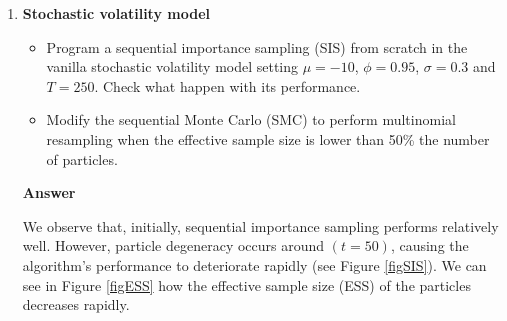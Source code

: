 \begin{enumerate}[leftmargin=*]
\item \textbf{Stochastic volatility model}
\begin{itemize}
	\item Program a sequential importance sampling (SIS) from scratch in the vanilla stochastic volatility model setting $\mu=-10$, $\phi = 0.95$, $\sigma=0.3$ and $T=250$. Check what happen with its performance.
	\item Modify the sequential Monte Carlo (SMC) to perform multinomial resampling when the effective sample size is lower than 50\% the number of particles.  
\end{itemize}

\textbf{Answer}

We observe that, initially, sequential importance sampling performs relatively well. However, particle degeneracy occurs around $(t=50)$, causing the algorithm's performance to deteriorate rapidly (see Figure \ref{figSIS}). We can see in Figure \ref{figESS} how the effective sample size (ESS) of the particles decreases rapidly.


\end{enumerate}
